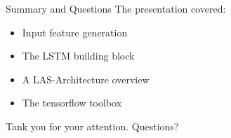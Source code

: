 \documentclass{beamer}
\begin{document}
\begin{frame}{Summary and Questions}
	The presentation covered:
	\begin{itemize}
		\item Input feature generation
		\item The LSTM building block
		\item A LAS-Architecture overview
		\item The tensorflow toolbox
	\end{itemize}
	Tank you for your attention. Questions?
\end{frame}
\end{document}
